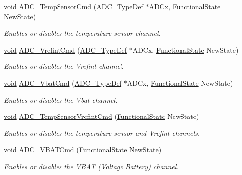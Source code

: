 \begin{DoxyCompactItemize}
\item 
\hyperlink{group___n_a_m_e_ga18028b8badbf1ea7e704ccac3c488e82}{void} \hyperlink{group___a_d_c___group3_ga0dd3e001351a4b767d198e7ea9847bd0}{A\-D\-C\-\_\-\-Temp\-Sensor\-Cmd} (\hyperlink{struct_a_d_c___type_def}{A\-D\-C\-\_\-\-Type\-Def} $\ast$A\-D\-Cx, \hyperlink{group___exported__types_gac9a7e9a35d2513ec15c3b537aaa4fba1}{Functional\-State} New\-State)
\begin{DoxyCompactList}\small\item\em Enables or disables the temperature sensor channel. \end{DoxyCompactList}\item 
\hyperlink{group___n_a_m_e_ga18028b8badbf1ea7e704ccac3c488e82}{void} \hyperlink{group___a_d_c___group3_ga5a0cdd8c4dd4a36e6b0b06c369608fa0}{A\-D\-C\-\_\-\-Vrefint\-Cmd} (\hyperlink{struct_a_d_c___type_def}{A\-D\-C\-\_\-\-Type\-Def} $\ast$A\-D\-Cx, \hyperlink{group___exported__types_gac9a7e9a35d2513ec15c3b537aaa4fba1}{Functional\-State} New\-State)
\begin{DoxyCompactList}\small\item\em Enables or disables the Vrefint channel. \end{DoxyCompactList}\item 
\hyperlink{group___n_a_m_e_ga18028b8badbf1ea7e704ccac3c488e82}{void} \hyperlink{group___a_d_c___group3_gacc19bfc67bbfd42c6f8f2617e82109c8}{A\-D\-C\-\_\-\-Vbat\-Cmd} (\hyperlink{struct_a_d_c___type_def}{A\-D\-C\-\_\-\-Type\-Def} $\ast$A\-D\-Cx, \hyperlink{group___exported__types_gac9a7e9a35d2513ec15c3b537aaa4fba1}{Functional\-State} New\-State)
\begin{DoxyCompactList}\small\item\em Enables or disables the Vbat channel. \end{DoxyCompactList}\item 
\hyperlink{group___n_a_m_e_ga18028b8badbf1ea7e704ccac3c488e82}{void} \hyperlink{group___a_d_c___group3_ga848682e2d7d3de9f8cf03ffa4c11f0b5}{A\-D\-C\-\_\-\-Temp\-Sensor\-Vrefint\-Cmd} (\hyperlink{group___exported__types_gac9a7e9a35d2513ec15c3b537aaa4fba1}{Functional\-State} New\-State)
\begin{DoxyCompactList}\small\item\em Enables or disables the temperature sensor and Vrefint channels. \end{DoxyCompactList}\item 
\hyperlink{group___n_a_m_e_ga18028b8badbf1ea7e704ccac3c488e82}{void} \hyperlink{group___a_d_c___group3_ga17fc58510ddc80024e65d9738ad6e98c}{A\-D\-C\-\_\-\-V\-B\-A\-T\-Cmd} (\hyperlink{group___exported__types_gac9a7e9a35d2513ec15c3b537aaa4fba1}{Functional\-State} New\-State)
\begin{DoxyCompactList}\small\item\em Enables or disables the V\-B\-A\-T (Voltage Battery) channel. \end{DoxyCompactList}\end{DoxyCompactItemize}


